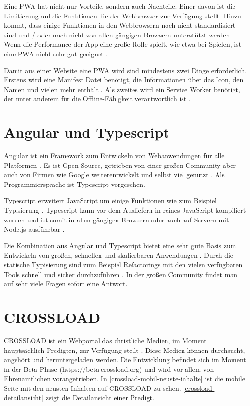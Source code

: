 Eine \ac{PWA} hat nicht nur Vorteile, sondern auch Nachteile. Einer davon ist die Limitierung auf die Funktionen die der Webbrowser zur Verfügung stellt. Hinzu kommt, dass einige Funktionen in den Webbrowsern noch nicht standardisiert sind und / oder noch nicht von allen gängigen Browsern unterstützt werden \autocite{majchrzak2018} \autocite{biorn2017}. Wenn die Performance der App eine große Rolle spielt, wie etwa bei Spielen, ist eine \ac{PWA} nicht sehr gut geeignet \autocite{biorn2017}.

Damit aus einer Website eine \ac{PWA} wird sind mindestens zwei Dinge erforderlich. Erstens wird eine Manifest Datei benötigt, die Informationen über das Icon, den Namen und vielen mehr enthält \autocite{Hajian2019} \autocite{Rojas2020}. Als zweites wird ein Service Worker benötigt, der unter anderem für die Offline-Fähigkeit verantwortlich ist \autocite{Rojas2020}. 


\section{Angular und Typescript}
Angular ist ein Framework zum Entwickeln von Webanwendungen für alle Platformen \autocite{angular-io}. Es ist Open-Source, getrieben von einer großen Community aber auch von Firmen wie Google weiterentwickelt und selbst viel genutzt \autocite{angular-io}. Als Programmiersprache ist Typescript vorgesehen. 

Typescript erweitert JavaScript um einige Funktionen wie zum Beispiel Typisierung \autocite{typescript-org}. Typescript kann vor dem Ausliefern in reines JavaScript kompiliert werden und ist somit in allen gängigen Browsern oder auch auf Servern mit Node.js ausführbar \autocite{typescript-org}.

Die Kombination aus Angular und Typescript bietet eine sehr gute Basis zum Entwickeln von großen, schnellen und skalierbaren Anwendungen \autocite{angular-io}. Durch die statische Typisierung sind zum Beispiel Refactorings mit den vielen verfügbaren Tools schnell und sicher durchzuführen \autocite{typescript-org} \autocite{angular-io}. In der großen Community findet man auf sehr viele Fragen sofort eine Antwort.

\section{CROSSLOAD}
CROSSLOAD ist ein Webportal das christliche Medien, im Moment hauptsächlich Predigten, zur Verfügung stellt \autocite{crossload-org}. Diese Medien können durchsucht, angehört und heruntergeladen werden. Die Entwicklung befindet sich im Moment in der Beta-Phase (https://beta.crossload.org) und wird vor allem von Ehrenamtlichen vorangetrieben. In \autoref{crossload-mobil-neuste-inhalte} ist die mobile Seite mit den neusten Inhalten auf CROSSLOAD zu sehen. \autoref{crossload-detailansicht} zeigt die Detailansicht einer Predigt.

